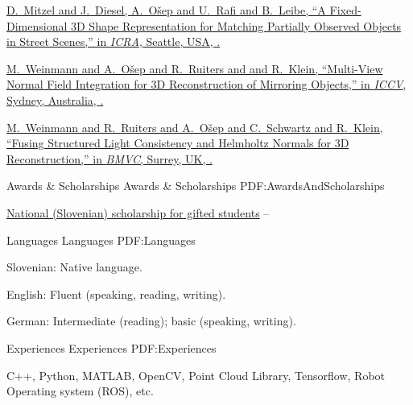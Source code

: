 \documentclass[letterpaper,MMMyyyy,nonstopmode]{simpleresumecv}
\begin{document}
\begin{Body}
\Gap
\href{https://www.vision.rwth-aachen.de/media/papers/mitzel15icra_3d_shape_representation.pdf}
{D.~Mitzel and J.~Diesel, \underline{A.~Ošep} and U.~Rafi and B.~Leibe,
``A Fixed-Dimensional 3D Shape Representation for Matching Partially Observed Objects in Street Scenes,''
in \textit{ICRA},
Seattle, USA,
.}

\Gap
\href{https://www.vision.rwth-aachen.de/media/papers/weinmann_reconstruction_of_mirroring_objects_iccv2013.pdf}
{M.~Weinmann and \underline{A.~Ošep} and R.~Ruiters and and R.~Klein,
``Multi-View Normal Field Integration for 3D Reconstruction of Mirroring Objects,''
in \textit{ICCV},
Sydney, Australia,
.}

\Gap
\href{https://www.vision.rwth-aachen.de/media/papers/weinmann-2012-3DReconstruction.pdf}
{M.~Weinmann and R.~Ruiters and \underline{A.~Ošep} and C.~Schwartz and R.~Klein,
``Fusing Structured Light Consistency and Helmholtz Normals for 3D Reconstruction,''
in \textit{BMVC},
Surrey, UK,
.}

\endgroup


\Section
{Awards \&\newline
Scholarships}
{Awards \& Scholarships}
{PDF:AwardsAndScholarships}

\Gap
\BulletItem
\href{http://www.sklad-kadri.si/en/scholarships/zois-scholarships/}{National (Slovenian) scholarship for gifted students}
\hfill
{} --
\newline


\Section
{Languages}
{Languages}
{PDF:Languages}

\BulletItem
Slovenian: Native language.

\Gap
\BulletItem
English: Fluent (speaking, reading, writing).

\Gap
\BulletItem
German: Intermediate (reading); basic (speaking, writing).


\Section
{Experiences}
{Experiences}
{PDF:Experiences}

C++,
Python,
MATLAB,
OpenCV,
Point Cloud Library,
Tensorflow,
Robot Operating system (ROS),
etc.


\end{Body}
\end{document}
